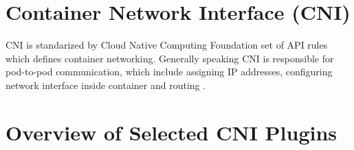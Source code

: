 
\section{Container Network Interface (CNI)}
\label{sec:cni}
CNI is standarized by Cloud Native Computing Foundation set of API rules which defines container networking. Generally speaking CNI is responsible for pod-to-pod communication, which include assigning IP addresses, configuring network interface inside container and routing \cite{IBMKubernetesNetworking}.




\section{Overview of Selected CNI Plugins}
\label{sec:cni_overview}


